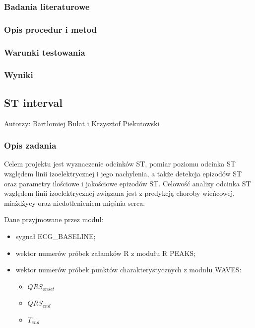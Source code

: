 \documentclass[a4paper, 11pt]{article}
\begin{document}
\subsubsection{Badania literaturowe}
\label{sec:qrs_class:papers}

\subsubsection{Opis procedur i metod}
\label{sec:qrs_class:procs}

\subsubsection{Warunki testowania}
\label{sec:qrs_class:tests}

\subsubsection{Wyniki}
\label{sec:qrs_class:results}



\subsection{ST interval}
\label{sec:st_interval}
Autorzy: Bartłomiej Bułat i Krzysztof Piekutowski

\subsubsection{Opis zadania}
\label{sec:st_interval:desc}
Celem projektu jest wyznaczenie odcinków ST, pomiar poziomu odcinka ST względem
linii izoelektrycznej i jego nachylenia, a także detekcja epizodów ST oraz
parametry ilościowe i jakościowe epizodów ST. Celowość analizy odcinka ST
względem linii izoelektrycznej związana jest z predykcją choroby wieńcowej,
miażdżycy oraz niedotlenieniem mięśnia serca.

Dane przyjmowane przez moduł:
\begin{itemize}
  \item sygnał ECG\_BASELINE;
  \item wektor numerów próbek załamków R z modułu R PEAKS;
  \item wektor numerów próbek punktów charakterystycznych z modułu WAVES:
  \begin{itemize}
    \item $QRS_{onset}$
    \item $QRS_{end}$
    \item $T_{end}$
  \end{itemize}  
\end{itemize}
\end{document}
